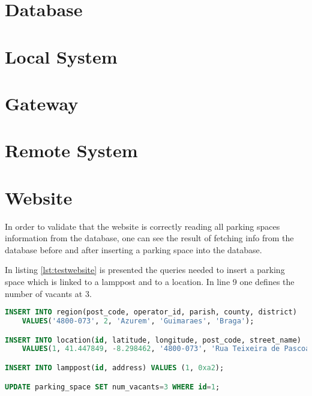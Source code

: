 \section{Database}

\section{Local System}


\section{Gateway}

\section{Remote System}

\section{Website}
In order to validate that the website is correctly reading all parking spaces information from the database, one can see the result of fetching info from the database before and after inserting a parking space into the database.

In listing \ref{lst:testwebsite} is presented the queries needed to insert a parking space which is linked to a lamppost and to a location. In line 9 one defines the number of vacants at 3.

\begin{lstlisting}[language=SQL, caption={Test Website: add parking space to the database.}, label={lst:testwebsite}]
INSERT INTO region(post_code, operator_id, parish, county, district) 
	VALUES('4800-073', 2, 'Azurem', 'Guimaraes', 'Braga');

INSERT INTO location(id, latitude, longitude, post_code, street_name) 
	VALUES(1, 41.447849, -8.298462, '4800-073', 'Rua Teixeira de Pascoais');

INSERT INTO lamppost(id, address) VALUES (1, 0xa2);

UPDATE parking_space SET num_vacants=3 WHERE id=1;
\end{lstlisting}

